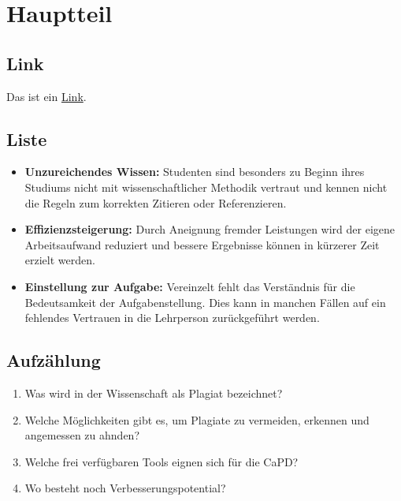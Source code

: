 \chapter{Hauptteil}

\section{Link}
Das ist ein \hyperref[ch:intro]{Link}.

\section{Liste}
\begin{itemize}
    \item \textbf{Unzureichendes Wissen:} Studenten sind besonders zu Beginn ihres Studiums nicht mit wissenschaftlicher Methodik vertraut und kennen \ggf{} nicht die Regeln zum korrekten Zitieren oder Referenzieren.
    \item \textbf{Effizienzsteigerung:} Durch Aneignung fremder Leistungen wird der eigene Arbeitsaufwand reduziert und bessere Ergebnisse können in kürzerer Zeit erzielt werden.
    \item \textbf{Einstellung zur Aufgabe:} Vereinzelt fehlt das Verständnis für die Bedeutsamkeit der Aufgabenstellung. Dies kann in manchen Fällen auf ein fehlendes Vertrauen in die Lehrperson zurückgeführt werden.
\end{itemize}

\section{Aufzählung}
\begin{enumerate}[label=RQ\arabic*.]
    \item Was wird in der Wissenschaft als Plagiat bezeichnet?
    \item Welche Möglichkeiten gibt es, um Plagiate zu vermeiden, erkennen und angemessen zu ahnden?
    \item Welche frei verfügbaren Tools eignen sich für die CaPD?
    \item Wo besteht noch Verbesserungspotential?
\end{enumerate}

